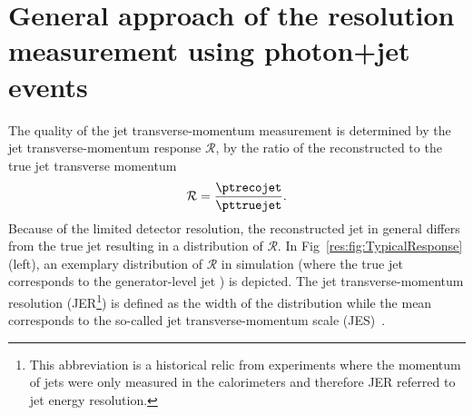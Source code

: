 \FloatBarrier
\chapter{General approach of the resolution measurement using photon+jet events}
\label{res:ch:GeneralApproach}
The quality of the jet transverse-momentum measurement is determined by the jet transverse-momentum response $\mathcal{R}$, \ie by the ratio of the reconstructed to the true jet transverse momentum 
\begin{equation}\label{res:eq:responseFormula}
\mathcal{R} =  \frac{\ptrecojet}{\pttruejet}.
\end{equation}
Because of the limited detector resolution, the reconstructed jet \pt in general differs from the true jet \pt resulting in a distribution of $\mathcal{R}$.
In Fig~\ref{res:fig:TypicalResponse} (left), an exemplary distribution of $\mathcal{R}$ in simulation (where the true jet \pt corresponds to the generator-level jet \pt) is depicted.
The jet transverse-momentum resolution (JER\footnote{This abbreviation is a historical relic from experiments where the momentum of jets were only measured in the calorimeters and therefore JER referred to jet energy resolution.}) is defined as the width of the distribution while the mean corresponds to the so-called jet transverse-momentum scale (JES)~\cite{bib:CMS:JME_PAS}.




